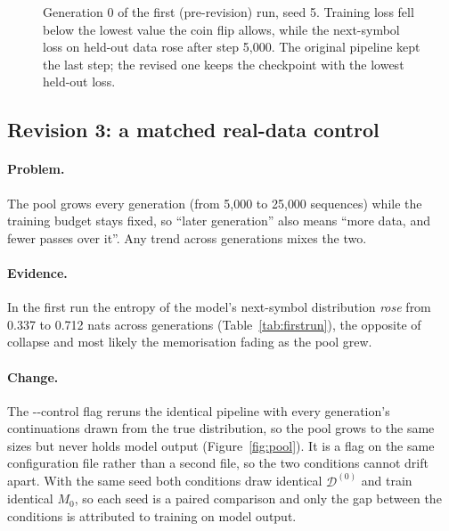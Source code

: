 \documentclass[11pt,a4paper]{article}
\newcommand{\data}[1]{\mathcal{D}^{(#1)}}
\DeclareRobustCommand{\code}[1]{\begingroup\ttfamily\def\_{\textunderscore\allowbreak}#1\endgroup}
\begin{document}
\begin{figure}[htbp]
\caption{Generation 0 of the first (pre-revision) run, seed 5. Training loss
fell below the lowest value the coin flip allows, while the next-symbol loss
on held-out data rose after step 5{,}000. The original pipeline kept the last
step; the revised one keeps the checkpoint with the lowest held-out loss.}
\label{fig:overfit}
\end{figure}

\subsection{Revision 3: a matched real-data control}\label{sec:r3}
\paragraph{Problem.} The pool grows every generation (from 5{,}000 to 25{,}000
sequences) while the training budget stays fixed, so ``later generation'' also
means ``more data, and fewer passes over it''. Any trend across generations
mixes the two.
\paragraph{Evidence.} In the first run the entropy of the model's next-symbol
distribution \emph{rose} from 0.337 to 0.712 nats across generations
(Table~\ref{tab:firstrun}), the opposite of collapse and most likely the
memorisation fading as the pool grew.
\paragraph{Change.} The \code{-{}-control} flag reruns the identical pipeline
with every generation's continuations drawn from the true distribution, so
the pool grows to the same sizes but never holds model output
(Figure~\ref{fig:pool}). It is a flag on the same configuration file rather
than a second file, so the two conditions cannot drift apart. With the same
seed both conditions draw identical $\data{0}$ and train identical $M_0$, so
each seed is a paired comparison and only the gap between the conditions is
attributed to training on model output.
\end{document}
